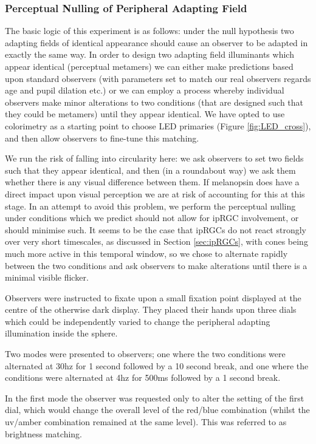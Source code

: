 \subsubsection{Perceptual Nulling of Peripheral Adapting Field} \label{sec:null}

The basic logic of this experiment is as follows: under the null hypothesis two adapting fields of identical appearance should cause an observer to be adapted in exactly the same way. In order to design two adapting field illuminants which appear identical (perceptual metamers) we can either make predictions based upon standard observers (with parameters set to match our real observers regards age and pupil dilation etc.) or we can employ a process whereby individual observers make minor alterations to two conditions (that are designed such that they could be metamers) until they appear identical. We have opted to use colorimetry as a starting point to choose LED primaries (Figure \ref{fig:LED_cross}), and then allow observers to fine-tune this matching.

We run the risk of falling into circularity here: we ask observers to set two fields such that they appear identical, and then (in a roundabout way) we ask them whether there is any visual difference between them. If melanopsin does have a direct impact upon visual perception we are at risk of accounting for this at this stage. In an attempt to avoid this problem, we perform the perceptual nulling under conditions which we predict should not allow for \gls{ipRGC} involvement, or should minimise such. It seems to be the case that \glspl{ipRGC} do not react strongly over very short timescales, as discussed in Section \ref{sec:ipRGCs}, with cones being much more active in this temporal window, so we chose to alternate rapidly between the two conditions and ask observers to make alterations until there is a minimal visible flicker.

Observers were instructed to fixate upon a small fixation point displayed at the centre of the otherwise dark display. They placed their hands upon three dials which could be independently varied to change the peripheral adapting illumination inside the sphere.

Two modes were presented to observers; one where the two conditions were alternated at 30hz for 1 second followed by a 10 second break, and one where the conditions were alternated at 4hz for 500ms followed by a 1 second break. 

In the first mode the observer was requested only to alter the setting of the first dial, which would change the overall level of the red/blue combination (whilst the uv/amber combination remained at the same level). This was referred to as brightness matching.

